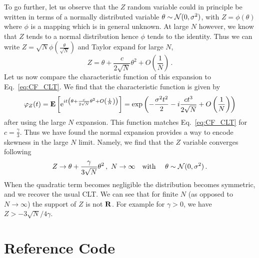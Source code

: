 \documentclass[11pt]{article}
\newcommand{\be}{\begin{equation}}
\newcommand{\ee}{\end{equation}}
\begin{document}
To go further, let us observe that the $Z$ random variable could in principle be written in terms of a normally distributed variable $\theta\sim {\cal N}(0,\sigma^2)$,
 with $Z=\phi(\theta)$ where $\phi$ is a mapping which is in general unknown.  At large $N$ however, we know that $Z$ tends to a normal distribution hence $\phi$ tends to the identity. Thus we can write $Z=\sqrt{N}\phi\left(\frac{\theta}{\sqrt{N}}\right)$ and Taylor expand for large $N$,
\be
Z=\theta+\frac{c}{2\sqrt{N}}\theta^2+O\left(\frac{1}{N}\right)\,.
\ee
Let us now compare the characteristic function of  this expansion to Eq.~\eqref{eq:CF_CLT}.
We find that the characteristic function is given by
\be
\varphi_Z(t)={\bf E} \left[ \mathrm{e}^{it \left(\theta+\frac{c}{2\sqrt{N}}\theta^2+O\left(\frac{1}{N}\right)\right)} \right]
=\exp\left(-\frac{\sigma^2 t^2}{2}-i \frac{c t^3}{ 2 \sqrt{N}} +O\left(\frac{1}{N}\right)\right)
\label{eq:CF_exp}
\ee
after using the large $N$ expansion. This function matches Eq.~\eqref{eq:CF_CLT} for $c=\frac{\gamma}{3}$. Thus we have found the normal expansion provides a way to encode skewness in the large $N$ limit. Namely, we find that the $Z$ variable converges following
\be
Z\rightarrow \theta+\frac{\gamma}{3\sqrt{N}}\theta^2\,,\,\,N\rightarrow \infty  \quad \textrm{with } \quad \theta\sim{\cal N}(0,\sigma^2)\,.
\ee
When the quadratic term becomes negligible the distribution becomes symmetric, and we recover the usual CLT.
We can see that  for finite $N$ (as opposed to $N\rightarrow \infty$) the support of $Z$ is not $\bf R$. For example for $\gamma>0$, we have
$Z > -3\sqrt{N}/4\gamma$.



\section{Reference Code}
\label{app:reference_code}
\end{document}
